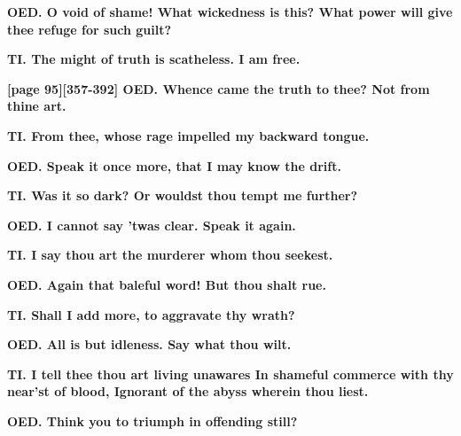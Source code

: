 \documentclass[11pt,letter]{book}
\begin{document}
\par \textbf{OED. O void of shame! What wickedness is this? What power will give thee refuge for such guilt?}
\par 

\par \textbf{TI. The might of truth is scatheless. I am free.}
\par 

\par \textbf{[page 95][357-392] OED. Whence came the truth to thee? Not from thine art.}
\par 

\par \textbf{TI. From thee, whose rage impelled my backward tongue.}
\par 

\par \textbf{OED. Speak it once more, that I may know the drift.}
\par 

\par \textbf{TI. Was it so dark? Or wouldst thou tempt me further?}
\par 

\par \textbf{OED. I cannot say ’twas clear. Speak it again.}
\par 

\par \textbf{TI. I say thou art the murderer whom thou seekest.}
\par 

\par \textbf{OED. Again that baleful word! But thou shalt rue.}
\par 

\par \textbf{TI. Shall I add more, to aggravate thy wrath?}
\par 

\par \textbf{OED. All is but idleness. Say what thou wilt.}
\par 

\par \textbf{TI. I tell thee thou art living unawares In shameful commerce with thy near’st of blood, Ignorant of the abyss wherein thou liest.}
\par 

\par \textbf{OED. Think you to triumph in offending still?}
\par 
\end{document}
